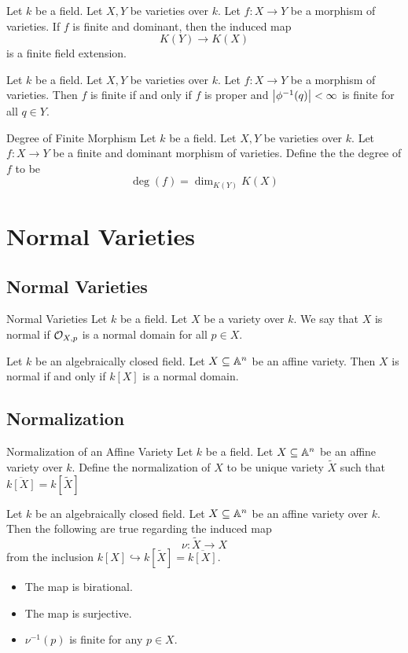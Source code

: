 \documentclass[a4paper]{article}
\begin{document}
\begin{prp}{}{} Let $k$ be a field. Let $X,Y$ be varieties over $k$. Let $f:X\to Y$ be a morphism of varieties. If $f$ is finite and dominant, then the induced map $$K(Y)\to K(X)$$ is a finite field extension. 
\end{prp}

\begin{prp}{}{} Let $k$ be a field. Let $X,Y$ be varieties over $k$. Let $f:X\to Y$ be a morphism of varieties. Then $f$ is finite if and only if $f$ is proper and $\abs{\phi^{-1}(q)}<\infty$ is finite for all $q\in Y$. 
\end{prp}

\begin{defn}{Degree of Finite Morphism}{} Let $k$ be a field. Let $X,Y$ be varieties over $k$. Let $f:X\to Y$ be a finite and dominant morphism of varieties. Define the the degree of $f$ to be $$\deg(f)=\dim_{K(Y)}K(X)$$
\end{defn}

\pagebreak
\section{Normal Varieties}
\subsection{Normal Varieties}
\begin{defn}{Normal Varieties}{} Let $k$ be a field. Let $X$ be a variety over $k$. We say that $X$ is normal if $\mathcal{O}_{X,p}$ is a normal domain for all $p\in X$. 
\end{defn}

\begin{prp}{}{} Let $k$ be an algebraically closed field. Let $X\subseteq\mathbb{A}^n$ be an affine variety. Then $X$ is normal if and only if $k[X]$ is a normal domain. 
\end{prp}

\subsection{Normalization}
\begin{defn}{Normalization of an Affine Variety}{} Let $k$ be a field. Let $X\subseteq\mathbb{A}^n$ be an affine variety over $k$. Define the normalization of $X$ to be unique variety $\widetilde{X}$ such that $\overline{k[X]}=k[\widetilde{X}]$
\end{defn}

\begin{prp}{}{} Let $k$ be an algebraically closed field. Let $X\subseteq\mathbb{A}^n$ be an affine variety over $k$. Then the following are true regarding the induced map $$\nu:\widetilde{X}\to X$$ from the inclusion $k[X]\hookrightarrow k[\widetilde{X}]=\overline{k[X]}$. 
\begin{itemize}
\item The map is birational. 
\item The map is surjective. 
\item $\nu^{-1}(p)$ is finite for any $p\in X$. 
\end{itemize}
\end{prp}
\end{document}
